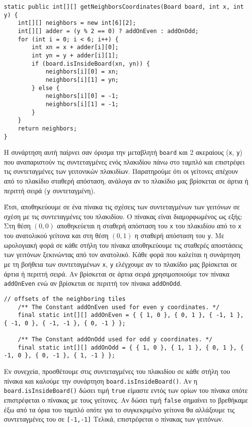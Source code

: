 \begin{enumerate}
\begin{lstlisting}[caption={Η συνάρτηση \lstinline!getNeighborsCoordinates()!}, breaklines=true, numbers=none]
static public int[][] getNeighborsCoordinates(Board board, int x, int y) {
	int[][] neighbors = new int[6][2];
	int[][] adder = (y % 2 == 0) ? addOnEven : addOnOdd;
	for (int i = 0; i < 6; i++) {
		int xn = x + adder[i][0];
		int yn = y + adder[i][1];
		if (board.isInsideBoard(xn, yn)) {
			neighbors[i][0] = xn;
			neighbors[i][1] = yn;
		} else {
			neighbors[i][0] = -1;
			neighbors[i][1] = -1;
		}
	}
	return neighbors;
}
\end{lstlisting}

Η συνάρτηση αυτή παίρνει σαν όρισμα την μεταβλητή \lstinline!board!
και 2 ακεραίους (\lstinline!x!, \lstinline!y!) που αναπαριστούν τις συντεταγμένες ενός πλακιδίου πάνω στο ταμπλό
και επιστρέφει τις συντεταγμένες των γειτονικών πλακιδίων.
Παρατηρούμε ότι οι γείτονες απέχουν από το πλακίδιο σταθερή απόσταση,
ανάλογα αν το πλακίδιο μας βρίσκεται σε άρτια ή περιττή σειρά (\lstinline!y! συντεταγμένη).

Έτσι, αποθηκεύουμε σε ένα πίνακα τις σχέσεις των συντεταγμένων των γειτόνων σε σχέση με τις συντεταγμένες του πλακιδίου.
Ο πίνακας είναι διαμορφωμένος ως εξής:
Στη θέση $(0,0)$ αποθηκεύεται η σταθερή απόσταση του \lstinline!x! του πλακιδίου από το \lstinline!x! του ανατολικού γείτονα
και στη θέση $(0,1)$ η σταθερή απόσταση του \lstinline!y!.
Mε ωρολογιακή φορά σε κάθε στήλη του πίνακα αποθηκεύουμε τις σταθερές αποστάσεις των γειτόνων ξεκινώντας από τον ανατολικό.
Κάθε φορά που καλείται η συνάρτηση με τη βοήθεια των συντεταγμένων \lstinline!x!, \lstinline!y!
ελέγχουμε αν το πλακίδιο μας βρίσκεται σε άρτια ή περιττή σειρά.
Αν βρίσκεται σε άρτια σειρά χρησιμοποιούμε τον πίνακα  \lstinline!addOnEven! ενώ αν βρίσκεται σε περιττή τον πίνακα \lstinline!addOnOdd!.

\begin{lstlisting}[caption={Οι πίνακες \lstinline!addOnEven! και \lstinline!addOnOdd!}, breaklines=true, numbers=none]
	// offsets of the neighboring tiles
	/** The Constant addOnEven used for even y coordinates. */
	final static int[][] addOnEven = { { 1, 0 }, { 0, 1 }, { -1, 1 }, { -1, 0 }, { -1, -1 }, { 0, -1 } };

	/** The Constant addOnOdd used for odd y coordinates. */
	final static int[][] addOnOdd = { { 1, 0 }, { 1, 1 }, { 0, 1 }, { -1, 0 }, { 0, -1 }, { 1, -1 } };
\end{lstlisting}

\begin{sloppypar}
Εν συνεχεία, προσθέτουμε στις συντεταγμένες του πλακιδίου σε κάθε στήλη του πίνακα και καλούμε την συνάρτηση \lstinline!board.isInsideBoard()!.
Αν η \lstinline!board.isInsideBoard()! δώσει τιμή \lstinline!true! είμαστε εντός των ορίων του πίνακα οπότε επιστρέφεται ο πίνακας με τους γείτονες.
Αν δώσει τιμή \lstinline!false! σημαίνει το βρεθήκαμε έξω από τα όρια του ταμπλό οπότε για το συγκεκριμένο γείτονα θα αλλάξουμε τις συντεταγμένες του σε \lstinline![-1,-1]!
Τελικά, επιστρέφεται ο πίνακας των γειτόνων.
\end{sloppypar}
\end{enumerate}
